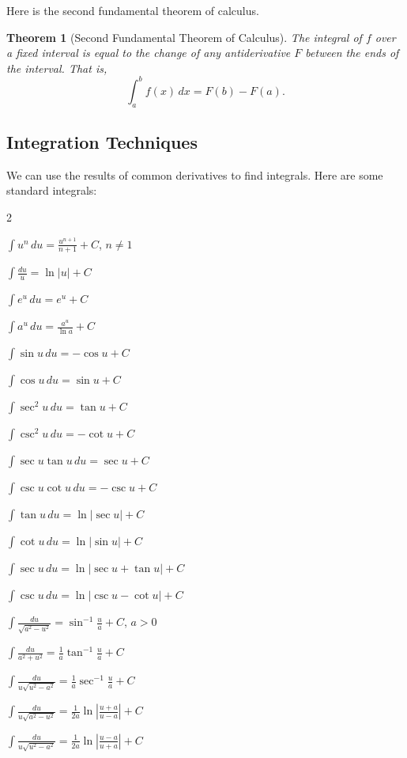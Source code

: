 \documentclass[11pt]{scrartcl}
\theoremstyle{plain}
\newtheorem{theorem}{Theorem}[section]
\theoremstyle{definition}
\theoremstyle{remark}
\begin{document}
Here is the second fundamental theorem of calculus.

\begin{theorem}[Second Fundamental Theorem of Calculus]
    The integral of $f$ over a fixed interval is equal to the change of any antiderivative $F$ between the ends of the interval. That is,
    \[ \int_{a}^{b} f(x) \, dx =F(b)-F(a). \]
\end{theorem}

\subsection{Integration Techniques}

We can use the results of common derivatives to find integrals. Here are some standard integrals:

\begin{itemize}
    \begin{multicols}{2}
        \item $\int u^n \, du = \frac{u^{n+1}}{n+1}+C$, $n\neq 1$
        \item $\int \frac{du}{u} =\ln \lvert u \rvert+C$
        \item $\int e^u \, du =e^u+C$
        \item $\int a^u \, du =\frac{a^u}{\ln a}+C$
        \item $\int \sin u \, du =-\cos u+C$
        \item $\int \cos u \, du =\sin u+C$
        \item $\int \sec ^{2}u \, du = \tan u+C$
        \item $\int \csc ^{2}u \, du = -\cot u+C$
        \item $\int \sec u\tan u \, du = \sec u+C$
        \item $\int \csc u\cot u \, du = -\csc u+C$
        \item $\int \tan u \, du = \ln \lvert \sec u \rvert+C$
        \item $\int \cot u \, du = \ln \lvert \sin u \rvert+C$
        \item $\int \sec u \, du = \ln \lvert \sec u+\tan u \rvert+C$
        \item $\int \csc u \, du = \ln \lvert \csc u-\cot u \rvert+C$
        \item $\int \frac{du}{\sqrt{ a^{2}-u^{2} }}=\sin^{-1} \frac{u}{a}+C$, $a>0$
        \item $\int \frac{du}{a^{2}+u^{2}}=\frac{1}{a} \tan^{-1} \frac{u}{a}+C$
        \item $\int \frac{du}{u\sqrt{ u^{2}-a^{2} }}=\frac{1}{a} \sec^{-1} \frac{u}{a}+C$
        \item $\int \frac{du}{u\sqrt{ a^{2}-u^{2} }}=\frac{1}{2a} \ln \left\lvert  \frac{{u+a}}{u-a}  \right\rvert+C$
        \item $\int \frac{du}{u\sqrt{ u^{2}-a^{2} }}=\frac{1}{2a} \ln \left\lvert  \frac{{u-a}}{u+a}  \right\rvert+C$
    \end{multicols}
\end{itemize}
\end{document}
